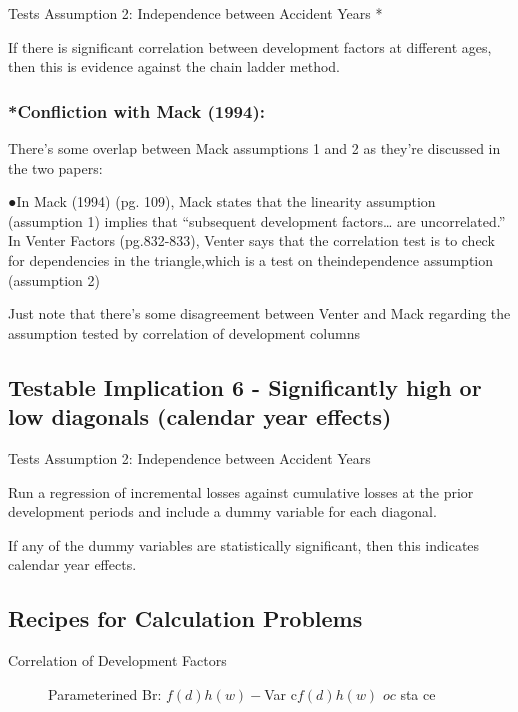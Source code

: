\documentclass[
]{article}
\begin{document}
Tests Assumption 2: Independence between Accident Years *

If there is significant correlation between development factors at
different ages, then this is evidence against the chain ladder method.

\subsubsection{*Confliction with Mack
(1994):}\label{confliction-with-mack-1994}

There's some overlap between Mack assumptions 1 and 2 as they're
discussed in the two papers:

●In Mack (1994) (pg. 109), Mack states that the linearity assumption
(assumption 1) implies that ``subsequent development factors\ldots{} are
uncorrelated.'' In Venter Factors (pg.832-833), Venter says that the
correlation test is to check for dependencies in the triangle,which is a
test on theindependence assumption (assumption 2)

Just note that there's some disagreement between Venter and Mack
regarding the assumption tested by correlation of development columns

\subsection{Testable Implication 6 - Significantly high or low diagonals
(calendar year
effects)}\label{testable-implication-6---significantly-high-or-low-diagonals-calendar-year-effects}

Tests Assumption 2: Independence between Accident Years

Run a regression of incremental losses against cumulative losses at the
prior development periods and include a dummy variable for each
diagonal.

If any of the dummy variables are statistically significant, then this
indicates calendar year effects.

\subsection{Recipes for Calculation
Problems}\label{recipes-for-calculation-problems-5}

\begin{description}
\item[Correlation of Development Factors]
Parameterined Br: \(f(d)h(w)-\)Var c\(f(d)h(w)\) \(oc\) sta ce
\end{description}
\end{document}
